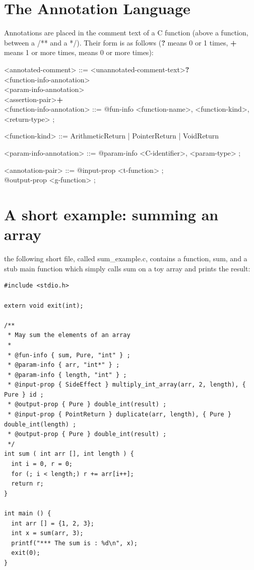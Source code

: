 \documentclass[notitlepage]{article}
\begin{document}
\section{The Annotation Language}

Annotations are placed in the comment text of a C function (above a function, between a /** and a */). Their form is as follows ({\bf ?} means 0 or 1 times, {\bf +} means 1 or more times, {\bf *} means 0 or more times{\bf}):

\ttfamily

<annotated-comment> ::= <unannotated-comment-text>{\bf ?} \\
\phantom{1}\hspace{120pt}<function-info-annotation> \\
\phantom{1}\hspace{120pt}<param-info-annotation>{\bf *} \\
\phantom{1}\hspace{120pt}<assertion-pair>{\bf +} \\

<function-info-annotation> ::= @fun-info { <function-name>, <function-kind>, <return-type> } ;

<function-kind> ::= ArithmeticReturn | PointerReturn | VoidReturn

<param-info-annotation> ::= @param-info { <C-identifier>, <param-type> } ;

<annotation-pair> ::= @input-prop <t-function>{\bf *} ; \\
\phantom{1}\hspace{110pt}@output-prop <g-function> ;

\rmfamily

\section{A short example: summing an array}

the following short file, called sum\_example.c, contains a function, sum, and a stub main function which simply calls sum on a toy array and prints the result:

\begin{verbatim}
#include <stdio.h>

extern void exit(int);

/**
 * May sum the elements of an array
 *
 * @fun-info { sum, Pure, "int" } ;
 * @param-info { arr, "int*" } ;
 * @param-info { length, "int" } ;
 * @input-prop { SideEffect } multiply_int_array(arr, 2, length), { Pure } id ;
 * @output-prop { Pure } double_int(result) ;
 * @input-prop { PointReturn } duplicate(arr, length), { Pure } double_int(length) ;
 * @output-prop { Pure } double_int(result) ;
 */
int sum ( int arr [], int length ) {
  int i = 0, r = 0;
  for (; i < length;) r += arr[i++];
  return r;
}

int main () {
  int arr [] = {1, 2, 3};
  int x = sum(arr, 3);
  printf("*** The sum is : %d\n", x);
  exit(0);
}
\end{verbatim}
\end{document}
